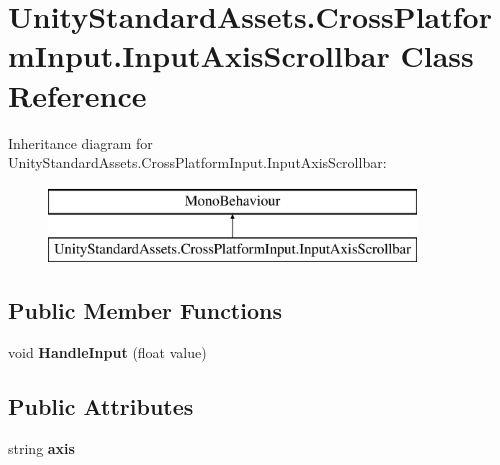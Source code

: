 \hypertarget{class_unity_standard_assets_1_1_cross_platform_input_1_1_input_axis_scrollbar}{}\section{Unity\+Standard\+Assets.\+Cross\+Platform\+Input.\+Input\+Axis\+Scrollbar Class Reference}
\label{class_unity_standard_assets_1_1_cross_platform_input_1_1_input_axis_scrollbar}
Inheritance diagram for Unity\+Standard\+Assets.\+Cross\+Platform\+Input.\+Input\+Axis\+Scrollbar\+:\begin{figure}[H]
\begin{center}
\leavevmode
\includegraphics[height=2.000000cm]{class_unity_standard_assets_1_1_cross_platform_input_1_1_input_axis_scrollbar}
\end{center}
\end{figure}
\subsection*{Public Member Functions}
\begin{DoxyCompactItemize}
\item 
\mbox{\label{class_unity_standard_assets_1_1_cross_platform_input_1_1_input_axis_scrollbar_a67a8adfeb9772b29115dfb34c52b11d0}} 
void {\bfseries Handle\+Input} (float value)
\end{DoxyCompactItemize}
\subsection*{Public Attributes}
\begin{DoxyCompactItemize}
\item 
\mbox{\label{class_unity_standard_assets_1_1_cross_platform_input_1_1_input_axis_scrollbar_ab06d4ff9319d7a63b3d6522249227ec6}} 
string {\bfseries axis}
\end{DoxyCompactItemize}
